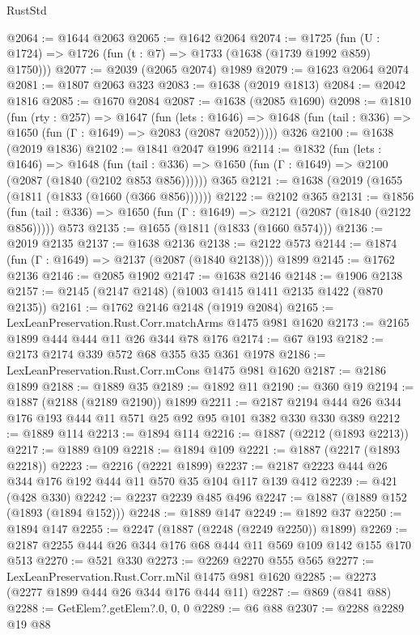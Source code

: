 \begin{lexlean}{RustStd}
\begin{coremodule}
@2064 := @1644 @2063
@2065 := @1642 @2064
@2074 := @1725 (fun (U : @1724) => @1726 (fun (t : @7) => @1733 (@1638 (@1739 @1992 @859) @1750)))
@2077 := @2039 (@2065 @2074) @1989
@2079 := @1623 @2064 @2074
@2081 := @1807 @2063 @323
@2083 := @1638 (@2019 @1813)
@2084 := @2042 @1816
@2085 := @1670 @2084
@2087 := @1638 (@2085 @1690)
@2098 := @1810
    (fun (rty : @257) =>
    @1647
      (fun (lets : @1646) =>
      @1648 (fun (tail : @336) => @1650 (fun (Γ : @1649) => @2083 (@2087 @2052)))))
    @326
@2100 := @1638 (@2019 @1836)
@2102 := @1841 @2047 @1996
@2114 := @1832
    (fun (lets : @1646) =>
    @1648 (fun (tail : @336) => @1650 (fun (Γ : @1649) => @2100 (@2087 (@1840 (@2102 @853 @856))))))
    @365
@2121 := @1638 (@2019 (@1655 (@1811 (@1833 (@1660 (@366 @856))))))
@2122 := @2102 @365
@2131 := @1856
    (fun (tail : @336) => @1650 (fun (Γ : @1649) => @2121 (@2087 (@1840 (@2122 @856)))))
    @573
@2135 := @1655 (@1811 (@1833 (@1660 @574)))
@2136 := @2019 @2135
@2137 := @1638 @2136
@2138 := @2122 @573
@2144 := @1874 (fun (Γ : @1649) => @2137 (@2087 (@1840 @2138))) @1899
@2145 := @1762 @2136
@2146 := @2085 @1902
@2147 := @1638 @2146
@2148 := @1906 @2138
@2157 := @2145 (@2147 @2148) (@1003 @1415 @1411 @2135 @1422 (@870 @2135))
@2161 := @1762 @2146 @2148 (@1919 @2084)
@2165 := LexLeanPreservation.Rust.Corr.matchArms @1475 @981 @1620
@2173 := @2165 @1899 @444 @444 @11 @26 @344 @78 @176
@2174 := @67 @193
@2182 := @2173 @2174 @339 @572 @68 @355 @35 @361 @1978
@2186 := LexLeanPreservation.Rust.Corr.mCons @1475 @981 @1620
@2187 := @2186 @1899
@2188 := @1889 @35
@2189 := @1892 @11
@2190 := @360 @19
@2194 := @1887 (@2188 (@2189 @2190)) @1899
@2211 := @2187 @2194 @444 @26 @344 @176 @193 @444 @11 @571 @25 @92 @95 @101 @382 @330 @330 @389
@2212 := @1889 @114
@2213 := @1894 @114
@2216 := @1887 (@2212 (@1893 @2213))
@2217 := @1889 @109
@2218 := @1894 @109
@2221 := @1887 (@2217 (@1893 @2218))
@2223 := @2216 (@2221 @1899)
@2237 := @2187 @2223 @444 @26 @344 @176 @192 @444 @11 @570 @35 @104 @117 @139 @412
@2239 := @421 (@428 @330)
@2242 := @2237 @2239 @485 @496
@2247 := @1887 (@1889 @152 (@1893 (@1894 @152)))
@2248 := @1889 @147
@2249 := @1892 @37
@2250 := @1894 @147
@2255 := @2247 (@1887 (@2248 (@2249 @2250)) @1899)
@2269 := @2187 @2255 @444 @26 @344 @176 @68 @444 @11 @569 @109 @142 @155 @170 @513
@2270 := @521 @330
@2273 := @2269 @2270 @555 @565
@2277 := LexLeanPreservation.Rust.Corr.mNil @1475 @981 @1620
@2285 := @2273 (@2277 @1899 @444 @26 @344 @176 @444 @11)
@2287 := @869 (@841 @88)
@2288 := GetElem?.getElem?.{0, 0, 0}
@2289 := @6 @88
@2307 := @2288
    @2289
    @19
    @88

\end{coremodule}
\end{lexlean}
